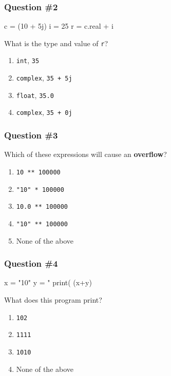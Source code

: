 \documentclass[11pt]{beamer}
\begin{document}
\begin{frame}[fragile]
  \frametitle{Question \#2}
  \Enlarge

  \begin{semiverbatim}
c = (10 + 5j)
i = 25
r = c.real + i
  \end{semiverbatim}
  What is the type and value of \texttt{r}?
  \begin{enumerate}[label=\Alph*]
  \item  \texttt{int}, \texttt{35}
  \item  \texttt{complex}, \texttt{35 + 5j}
  \item  \texttt{float}, \texttt{35.0}
  \item  \texttt{complex}, \texttt{35 + 0j}
  \end{enumerate}
\end{frame}

\begin{frame}
  \frametitle{Question \#3}
  \Enlarge

  Which of these expressions will cause an \textbf{overflow}?
  \begin{enumerate}[label=\Alph*]
  \item  \texttt{10 ** 100000}
  \item  \texttt{"10" * 100000}
  \item  \texttt{10.0 ** 100000}
  \item  \texttt{"10" ** 100000}
  \item  None of the above
  \end{enumerate}
\end{frame}

\begin{frame}[fragile]
  \frametitle{Question \#4}
  \Enlarge

  \begin{semiverbatim}
x = "10"
y = "%
print( (x+y) %
  \end{semiverbatim}
  What does this program print?
  \begin{enumerate}[label=\Alph*]
  \item  \texttt{102}
  \item  \texttt{1111}
  \item  \texttt{1010}
  \item  None of the above
  \end{enumerate}
\end{frame}
\end{document}
